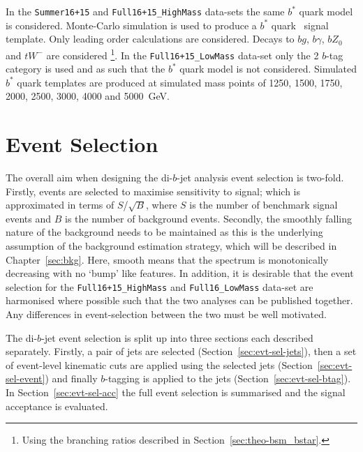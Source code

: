 \begin{itemize}[leftmargin=*]
  In the \verb|Summer16+15| and \verb|Full16+15_HighMass|
  data-sets the same $b^*$ quark model is considered.
  Monte-Carlo simulation is used to produce a $b^*$ quark \mjj~signal template.
  Only leading order calculations are considered.
  Decays to $bg$, $b\gamma$, $bZ_0$ and $tW^{-}$ are considered
  \footnote{Using the branching ratios described in Section~\ref{sec:theo-bsm_bstar}.}.
  In the \verb|Full16+15_LowMass| data-set
  only the 2 $b$-tag category is used
  and as such that the $b^*$ quark model is not considered.
  Simulated $b^*$ quark templates are produced at simulated mass points of
  1250, 1500, 1750, 2000, 2500, 3000, 4000 and 5000~GeV.
\end{itemize}

\section{Event Selection}
\label{sec:evt-sel}

The overall aim when designing the di-$b$-jet analysis event selection
is two-fold.
Firstly, events are selected to
maximise sensitivity to signal;
which is approximated in terms of $S$/$\sqrt{B}$,
where $S$ is the number of benchmark signal events and $B$ is the number of background events.
Secondly, the smoothly falling nature of the background needs to be maintained
as this is the underlying assumption of the background estimation strategy,
which will be described in Chapter~\ref{sec:bkg}.
Here, smooth means that the spectrum is monotonically decreasing with no `bump' like features.
In addition, it is desirable that the event selection for the
\verb|Full16+15_HighMass| and \verb|Full16_LowMass| data-set are
harmonised where possible such that the two analyses can be published together.
Any differences in event-selection between the two must be well motivated.

The di-$b$-jet event selection is split up into three sections each described separately.
Firstly, a pair of jets are selected (Section~\ref{sec:evt-sel-jets}),
then a set of event-level kinematic cuts are applied using the selected jets (Section~\ref{sec:evt-sel-event})
and finally $b$-tagging is applied to the jets (Section~\ref{sec:evt-sel-btag}).
In Section~\ref{sec:evt-sel-acc} the full event selection is summarised and
the signal acceptance is evaluated.


